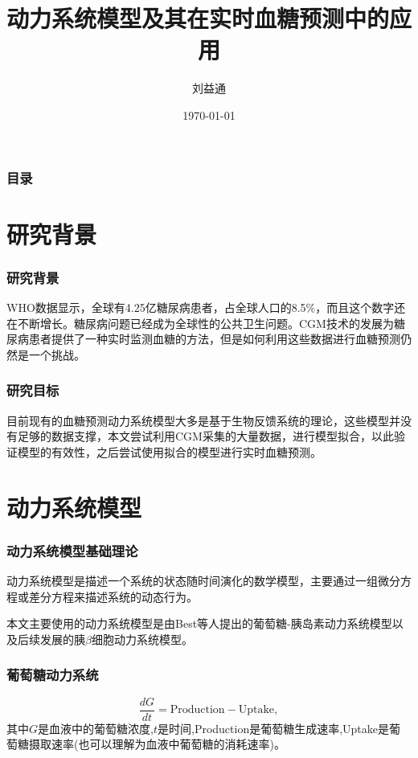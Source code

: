 \documentclass{beamer}
\title{动力系统模型及其在实时血糖预测中的应用}
\author{刘益通}
\institute{上海科技大学}
\date{\today}
\begin{document}

\begin{frame}
  \titlepage
\end{frame}

\begin{frame}
  \frametitle{目录}
  \tableofcontents
\end{frame}

\section{研究背景}
\begin{frame}
  \frametitle{研究背景}
    WHO数据显示，全球有4.25亿糖尿病患者，占全球人口的8.5\%，而且这个数字还在不断增长。糖尿病问题已经成为全球性的公共卫生问题。CGM技术的发展为糖尿病患者提供了一种实时监测血糖的方法，但是如何利用这些数据进行血糖预测仍然是一个挑战。
\end{frame}

\begin{frame}
  \frametitle{研究目标}
    目前现有的血糖预测动力系统模型大多是基于生物反馈系统的理论，这些模型并没有足够的数据支撑，本文尝试利用CGM采集的大量数据，进行模型拟合，以此验证模型的有效性，之后尝试使用拟合的模型进行实时血糖预测。
\end{frame}

\section{动力系统模型}

\begin{frame}
    \frametitle{动力系统模型基础理论}
    动力系统模型是描述一个系统的状态随时间演化的数学模型，主要通过一组微分方程或差分方程来描述系统的动态行为。

    本文主要使用的动力系统模型是由Best等人提出的葡萄糖-胰岛素动力系统模型\cite{best1981glucose}以及后续发展的胰$\beta$细胞动力系统模型\cite{topp2000model}。
\end{frame}
\begin{frame}
  \frametitle{葡萄糖动力系统}
  \begin{equation}\label{1}
    \frac{dG}{dt} = \text{Production} - \text{Uptake},
\end{equation}
其中$G$是血液中的葡萄糖浓度,$t$是时间,Production是葡萄糖生成速率,Uptake是葡萄糖摄取速率(也可以理解为血液中葡萄糖的消耗速率)。
\end{frame}
\end{document}
